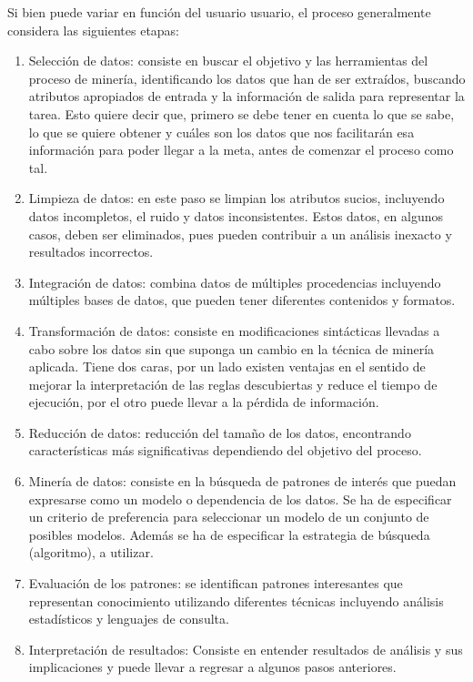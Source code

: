 Si bien puede variar en función del usuario usuario, el proceso generalmente considera las siguientes etapas:

\begin{enumerate}
\item Selección de datos: consiste en buscar el objetivo y las herramientas del proceso de minería, identificando los datos que han de ser extraídos, buscando atributos apropiados de entrada y la información de salida para representar la tarea. Esto quiere decir que, primero se debe tener en cuenta lo que se sabe, lo que se quiere obtener y cuáles son los datos que nos facilitarán esa información para poder llegar a la meta, antes de comenzar el proceso como tal.
\item Limpieza de datos: en este paso se limpian los atributos sucios, incluyendo datos incompletos, el ruido y datos inconsistentes. Estos datos, en algunos casos, deben ser eliminados, pues pueden contribuir a un análisis inexacto y resultados incorrectos.
\item Integración de datos:  combina datos de múltiples procedencias incluyendo múltiples bases de datos, que pueden tener diferentes contenidos y formatos.
\item Transformación de datos: consiste en modificaciones sintácticas llevadas a cabo sobre los datos sin que suponga un cambio en la técnica de minería aplicada. Tiene dos caras, por un lado existen ventajas en el sentido de mejorar la interpretación de las reglas descubiertas y reduce el tiempo de ejecución, por el otro puede llevar a la pérdida de información.
\item Reducción de datos: reducción del tamaño de los datos, encontrando características más significativas dependiendo del objetivo del proceso.
\item Minería de datos: consiste en la búsqueda de patrones de interés que puedan expresarse como un modelo o dependencia de los datos. Se ha de especificar un criterio de preferencia para seleccionar un modelo de un conjunto de posibles modelos. Además se ha de especificar la estrategia de búsqueda (algoritmo), a utilizar.
\item Evaluación de los patrones: se identifican patrones interesantes que representan conocimiento utilizando diferentes técnicas incluyendo análisis estadísticos y lenguajes de consulta.
\item Interpretación de resultados: Consiste en entender resultados de análisis y sus implicaciones y puede llevar a regresar a algunos pasos anteriores.
\end{enumerate}

